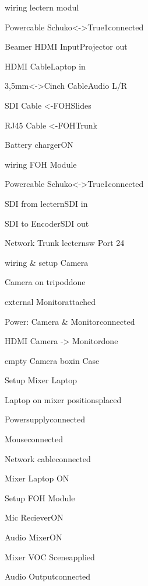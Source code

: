 \begin{checklist}{wiring lectern modul}
  \item{Powercable Schuko<->True1}{connected}
  \item{Beamer HDMI Input}{Projector out}
  \item{HDMI Cable}{Laptop in}
  \item{3,5mm<->Cinch Cable}{Audio L/R}
  \item{SDI Cable <-FOH}{Slides}
  \item{RJ45 Cable <-FOH}{Trunk}
  \item{Battery charger}{ON}
\end{checklist}

\begin{checklist}{wiring FOH Module}
  \item{Powercable Schuko<->True1}{connected}
  \item{SDI from lectern}{SDI in}
  \item{SDI to Encoder}{SDI out}
  \item{Network Trunk lectern}{sw Port 24}
\end{checklist}

\begin{checklist}{wiring & setup Camera}
  \item{Camera on tripod}{done}
  \item{external Monitor}{attached}
  \item{Power: Camera & Monitor}{connected}
  \item{HDMI Camera -> Monitor}{done}
  \item{empty Camera box}{in Case}
\end{checklist}

\begin{checklist}{Setup Mixer Laptop}
  \item{Laptop on mixer positions}{placed}
  \item{Powersupply}{connected}
  \item{Mouse}{connected}
  \item{Network cable}{connected}
  \item{Mixer Laptop }{ON}
\end{checklist}

\begin{checklist}{Setup FOH Module}
  \item{Mic Reciever}{ON}
  \item{Audio Mixer}{ON}
  \item{Mixer VOC Scene}{applied}
  \item{Audio Output}{connected}
\end{checklist}

